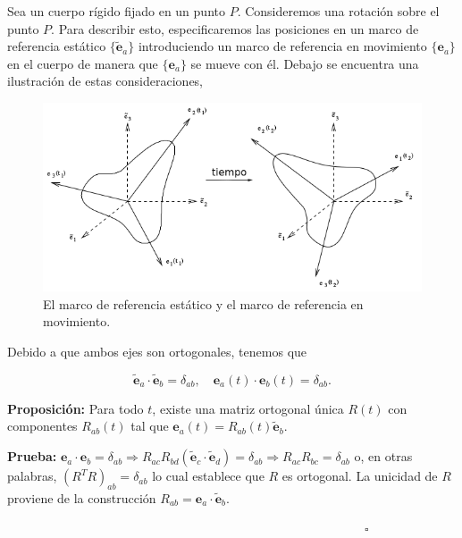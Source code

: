 \documentclass[a4paper,10pt]{article}
\numberwithin{equation}{section}
\newcommand{\prueba}{\textbf{Prueba: }}
\newcommand{\proposicion}{\textbf{Proposición: }}
\begin{document}
Sea un cuerpo rígido fijado en un punto $P$. Consideremos una rotación sobre el punto 
$P$. Para describir esto, especificaremos las posiciones en un marco de referencia 
estático $\{{\tilde{\mathbf{e}}_a\}}$ introduciendo un marco de referencia en movimiento $\{{\mathbf{e}_a}\}$
en el cuerpo de manera que $\{\mathbf{e}_a\}$ se mueve con él. Debajo se encuentra una 
ilustración de estas consideraciones,

\begin{figure}[H]
 \center 
 \includegraphics[scale=0.6]{problema5fig1}
 \caption{El marco de referencia estático y el marco de referencia en movimiento.}
\end{figure}

Debido a que ambos ejes son ortogonales, tenemos que 

\begin{equation}
 \tilde{\mathbf{e}}_a \cdot \tilde{\mathbf{e}}_b = \delta_{ab}, \quad \mathbf{e}_a(t) \cdot \mathbf{e}_b(t) = \delta_{ab}.
\end{equation}

\proposicion Para todo $t$, existe una matriz ortogonal única $R(t)$ con componentes 
$R_{ab}(t)$ tal que $\mathbf{e}_a(t) = R_{ab}(t)\tilde{\mathbf{e}}_b$.

\vspace{.3cm}

\prueba $\mathbf{e}_a \cdot \mathbf{e}_b = \delta_{ab} \Rightarrow R_{ac}R_{bd} 
(\tilde{\mathbf{e}}_c\cdot\tilde{\mathbf{e}}_d) = \delta_{ab} \Rightarrow R_{ac}R_{bc} = 
\delta_{ab}$ o, en otras palabras, $(R^TR)_{ab} = \delta_{ab}$ lo cual establece que 
$R$ es ortogonal. La unicidad de $R$ proviene de la construcción $R_{ab} = \mathbf{e}_a \cdot 
\tilde{\mathbf{e}}_b$.

$\hspace{12cm} \square$

\vspace{.3cm}
\end{document}
